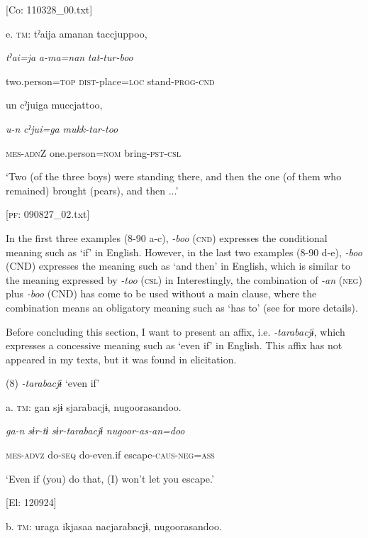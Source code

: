       [Co: 110328\_00.txt]

  e.  \textsc{tm}:  tˀaija  amanan  taccjuppoo,

      \textit{tˀai=ja}  \textit{a-ma=nan}  \textit{tat-tur-boo}

      two.person=\textsc{top}  \textsc{dist}-place=\textsc{loc}  stand-\textsc{prog}-\textsc{cnd}

      un  cˀjuiga  muccjattoo,

      \textit{u-n}  \textit{cˀjui=ga}  \textit{mukk-tar-too}

      \textsc{mes}-\textsc{adn}Z  one.person=\textsc{nom}  bring-\textsc{pst}-\textsc{csl}

      ‘Two (of the three boys) were standing there, and then the one (of them who remained) brought (pears), and then ...’

      [\textsc{pf}: 090827\_02.txt]

In the first three examples (8-90 a-c), \textit{{}-boo} (\textsc{cnd}) expresses the conditional meaning such as ‘if’ in English. However, in the last two examples (8-90 d-e), \textit{{}-boo} (CND) expresses the meaning such as ‘and then’ in English, which is similar to the meaning expressed by \textit{{}-too} (\textsc{csl}) in  Interestingly, the combination of \textit{{}-an} (\textsc{neg}) plus \textit{{}-boo} (CND) has come to be used without a main clause, where the combination means an obligatory meaning such as ‘has to’ (see  for more details).

  Before concluding this section, I want to present an affix, i.e. \textit{{}-tarabacjɨ}, which expresses a concessive meaning such as ‘even if’ in English. This affix has not appeared in my texts, but it was found in elicitation.

(8)  \textit{{}-tarabacjɨ} ‘even if’

  a.  \textsc{tm}:  gan  sjɨ  sjarabacjɨ,  nugoorasandoo.

      \textit{ga-n}  \textit{sɨr-tɨ}  \textit{sɨr-tarabacjɨ}  \textit{nugoor-as-an=doo}

      \textsc{mes}-\textsc{advz}  do-\textsc{seq}  do-even.if  escape-\textsc{caus}-\textsc{neg}=\textsc{ass}

      ‘Even if (you) do that, (I) won’t let you escape.’

      [El: 120924]

  b.  \textsc{tm}:  uraga  ikjasaa  nacjarabacjɨ,  nugoorasandoo.

